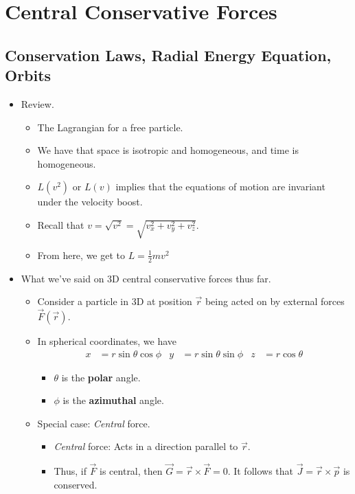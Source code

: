 \documentclass[../notes.tex]{subfiles}
\begin{document}
\chapter{Central Conservative Forces}
\section{Conservation Laws, Radial Energy Equation, Orbits}
\begin{itemize}
    \item {}Review.
    \begin{itemize}
        \item The Lagrangian for a free particle.
        \item We have that space is isotropic and homogeneous, and time is homogeneous.
        \item $L(v^2)$ or $L(v)$ implies that the equations of motion are invariant under the velocity boost.
        \item Recall that $v=\sqrt{v^2}=\sqrt{v_x^2+v_y^2+v_z^2}$.
        \item From here, we get to $L=\frac{1}{2}mv^2$
    \end{itemize}
    \item What we've said on 3D central conservative forces thus far.
    \begin{itemize}
        \item Consider a particle in 3D at position $\vec{r}$ being acted on by external forces $\vec{F}(\vec{r})$.
        \item In spherical coordinates, we have
        \begin{align*}
            x &= r\sin\theta\cos\phi&
            y &= r\sin\theta\sin\phi&
            z &= r\cos\theta
        \end{align*}
        \begin{itemize}
            \item $\theta$ is the \textbf{polar} angle.
            \item $\phi$ is the \textbf{azimuthal} angle.
        \end{itemize}
        \item Special case: \emph{Central} force.
        \begin{itemize}
            \item \emph{Central} force: Acts in a direction parallel to $\vec{r}$.
            \item Thus, if $\vec{F}$ is central, then $\vec{G}=\vec{r}\times\vec{F}=0$. It follows that $\vec{J}=\vec{r}\times\vec{p}$ is conserved.

\end{itemize}
\end{itemize}
\end{itemize}
\end{document}
